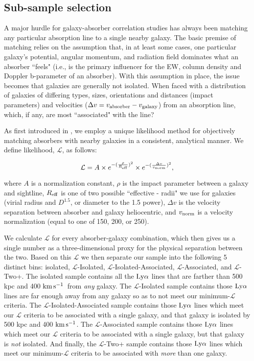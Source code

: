 \documentclass[twocolumn,tighten]{aastex62}
\newcommand{\kms}{$\rm km\, s^{-1}$}
\begin{document}
\subsection{Sub-sample selection}
A major hurdle for galaxy-absorber correlation studies has always been matching any particular absorption line to a single nearby galaxy. The basic premise of matching relies on the assumption that, in at least some cases, one particular galaxy's potential, angular momentum, and radiation field dominates what an absorber ``feels" (i.e., is the primary influencer for the EW, column density and Doppler b-parameter of an absorber). With this assumption in place, the issue becomes that galaxies are generally not isolated. When faced with a distribution of galaxies of differing types, sizes, orientations and distances (impact parameters) and velocities ($\Delta v = v_{\rm absorber} - v_{\rm galaxy}$) from an absorption line, which, if any, are most ``associated" with the line? 

As first introduced in \cite{french2017}, we employ a unique likelihood method for objectively matching absorbers with nearby galaxies in a consistent, analytical manner. We define likelihood, $\mathcal{L}$, as follows: 

\begin{equation}
\mathcal{L} = A \times e^{-(\frac{\rho}{R_{\rm eff}})^2} \times e^{-(\frac{\Delta v}{v_{\rm norm}})^2},
\label{likelihood}
\end{equation}

\noindent where $A$ is a normalization constant, $\rho$ is the impact parameter between a galaxy and sightline, $R_{\rm eff}$ is one of two possible ``effective - radii" we use for galaxies (virial radius and $D^{1.5}$, or diameter to the 1.5 power), $\Delta v$ is the velocity separation between absorber and galaxy heliocentric, and $v_{\rm norm}$ is a velocity normalization (equal to one of 150, 200, or 250). 

We calculate $\mathcal{L}$ for every absorber-galaxy combination, which then gives us a single number as a three-dimensional proxy for the physical separation between the two. Based on this $\mathcal{L}$ we then separate our sample into the following 5 distinct bins: isolated, $\mathcal{L}$-Isolated, $\mathcal{L}$-Isolated-Associated, $\mathcal{L}$-Associated, and $\mathcal{L}$-Two+. The isolated sample contains all the $\rm Ly\alpha$ lines that are farther than 500 kpc and 400 \kms~from \emph{any} galaxy. The $\mathcal{L}$-Isolated sample contains those $\rm Ly\alpha$ lines are far enough away from any galaxy so as to not meet our minimum-$\mathcal{L}$ criteria. The $\mathcal{L}$-Isolated-Associated sample contains those $\rm Ly\alpha$ lines which meet our $\mathcal{L}$ criteria to be associated with a single galaxy, and that galaxy is isolated by 500 kpc and 400 \kms. The $\mathcal{L}$-Associated sample contains those $\rm Ly\alpha$ lines which meet our $\mathcal{L}$ criteria to be associated with a single galaxy, but that galaxy is \emph{not} isolated. And finally, the 
$\mathcal{L}$-Two+ sample contains those  $\rm Ly\alpha$ lines which meet our minimum-$\mathcal{L}$ criteria to be associated with \emph{more} than one galaxy.
\end{document}
